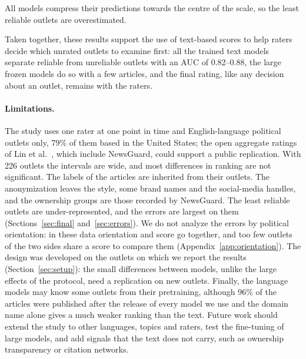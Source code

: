 \documentclass[11pt,a4paper]{article}
\begin{document}
All models compress their predictions towards the centre of the scale, so the least reliable outlets are
overestimated.

Taken together, these results support the use of text-based scores to help raters decide which unrated outlets to
examine first: all the trained text models separate reliable from unreliable outlets with an AUC of 0.82--0.88, the
large frozen models do so with a few articles, and the final rating, like any decision about an outlet, remains with the
raters.

\paragraph{Limitations.} The study uses one rater at one point in time and English-language political outlets only, 79\% of
them based in the United States; the
open aggregate ratings of Lin et al.~\cite{lin2023high}, which include NewsGuard, could support a public replication.
With 226 outlets the intervals are wide, and most differences in ranking are not significant. The labels of the articles
are inherited from their outlets. The anonymization leaves the style, some brand names and the social-media handles, and
the ownership groups are those recorded by NewsGuard. The least reliable outlets are under-represented, and the errors are largest on them
(Sections~\ref{sec:final} and~\ref{sec:errors}). We do not analyze the errors by political orientation: in these data
orientation and score go together, and too few outlets of the two sides share a score to compare them
(Appendix~\ref{app:orientation}). The design was developed on the outlets on which we report the results (Section~\ref{sec:setup}): the small differences
between models, unlike the large effects of the protocol, need a replication on new outlets. Finally, the
language models may know some outlets from their pretraining, although 96\% of the articles were published after the
release of every model we use and the domain name alone gives a much weaker ranking than the text. Future work should
extend the study to other languages, topics and raters, test the fine-tuning of large models, and add signals that the
text does not carry, such as ownership transparency or citation networks.
\end{document}
